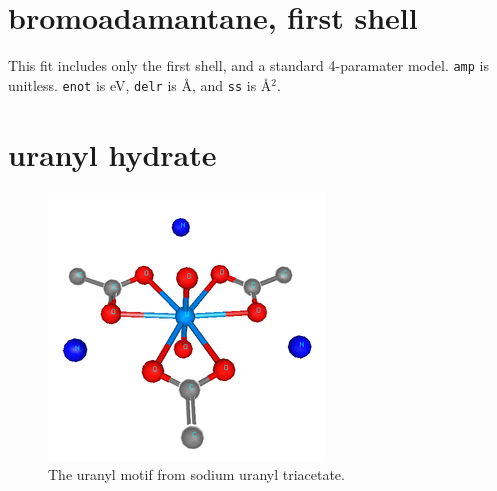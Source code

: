 \documentclass{article}
\let\stdsection\section
\renewcommand\section{\newpage\stdsection}
\begin{document}
\renewcommand{\feffmaterial}{bromoadamantane}
\renewcommand{\feffrone}{8}
\renewcommand{\fefffirst}{}

\small

\fitthreeplots


\section{bromoadamantane, first shell}
\normalsize

This fit includes only the first shell, and a standard 4-paramater
model.  \texttt{amp} is unitless.  \texttt{enot} is eV, \texttt{delr}
is \AA, and \texttt{ss} is \AA$^2$.

\renewcommand{\fefffirst}{_1st}

\small

\fitthreeplots







\section{uranyl hydrate}
\normalsize

\begin{figure}
  \includegraphics[width=\linewidth]{uranyl/uranyl.png}
  \caption{The uranyl motif from sodium uranyl triacetate.}
\end{figure}
\end{document}
